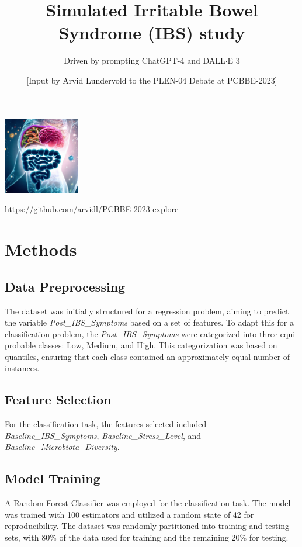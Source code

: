 \documentclass[10pt, oneside]{article}   	%
\title{Simulated Irritable Bowel Syndrome (IBS) study}
\author{Driven by prompting ChatGPT-4 and DALL$\cdot$E 3}
\date{\footnotesize [Input by Arvid Lundervold to the PLEN-04 Debate at PCBBE-2023]}							%
\begin{document}
\maketitle

\begin{center}
\includegraphics[width=0.25\textwidth]{pcbbe-debate-dalle-fig-ibs.png}

{\scriptsize \url{https://github.com/arvidl/PCBBE-2023-explore}}
\end{center}


\section{Methods}

\subsection{Data Preprocessing}
The dataset was initially structured for a regression problem, aiming to predict the variable \textit{Post\_IBS\_Symptoms} based on a set of features. To adapt this for a classification problem, the \textit{Post\_IBS\_Symptoms} were categorized into three equi-probable classes: Low, Medium, and High. This categorization was based on quantiles, ensuring that each class contained an approximately equal number of instances.

\subsection{Feature Selection}
For the classification task, the features selected included \textit{Baseline\_IBS\_Symptoms}, \textit{Baseline\_Stress\_Level}, and \textit{Baseline\_Microbiota\_Diversity}.

\subsection{Model Training}
A Random Forest Classifier was employed for the classification task. The model was trained with 100 estimators and utilized a random state of 42 for reproducibility. The dataset was randomly partitioned into training and testing sets, with 80\% of the data used for training and the remaining 20\% for testing.
\end{document}
